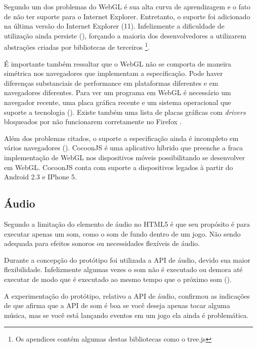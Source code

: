 Segundo \citet{html5mostwanted} um dos problemas do WebGL é sua alta
curva de aprendizagem e o fato de não ter suporte para o Internet
Explorer. Entretanto, o suporte foi adicionado na última versão do
Internet Explorer (11). Infelizmente a dificuldade de utilização
ainda persiste (), forçando a maioria dos
desenvolvedores a utilizarem abstrações criadas por bibliotecas de
terceiros \footnote{Os apendices contém algumas destas bibliotecas como
o tree.js}.

É importante também ressaltar que o WebGL não se comporta de
maneira simétrica nos navegadores que implementam a especificação.
Pode haver diferenças substanciais de performance em plataformas
diferentes e em navegadores diferentes. Para ver um programa em WebGL
é necessário um navegador recente, uma placa gráfica recente e um
sistema operacional que suporte a tecnologia \autocite{html5mostwanted}
(). Existe também uma lista de
placas gráficas com \textit{drivers} bloqueados por não funcionarem
corretamente no Firefox \autocite[p.42]{3daps}.

Além dos problemas citados, o suporte a especificação ainda é
incompleto em vários navegadores ().
CocoonJS é uma aplicativo híbrido que preenche a fraca implementação
de WebGL nos dispositivos móveis possibilitando se desenvolver em
WebGL. CocoonJS conta com suporte a dispositivos legados à partir do
Android 2.3 e IPhone 5.

\subsection{Áudio}

Segundo \citet{html5mostwanted} a limitação do elemento de áudio no
HTML5 é que seu propósito é para executar apenas um som, como o som
de fundo dentro de um jogo. Não sendo adequada para efeitos sonoros
ou necessidades flexíveis de áudio.

Durante a concepção do protótipo foi utilizada a API de áudio, devido
sua maior flexibilidade. Infelizmente algumas vezes o som não é
executado ou demora até executar de modo que é executado ao mesmo
tempo que o próximo som ().

A experimentação do protótipo, relativo a API de áudio, confirmou
as indicações de \citet{html5mostwanted} que afirma que a API de som
é boa se você deseja apenas tocar alguma música, mas se você está
lançando eventos em um jogo ela ainda é problemática.

